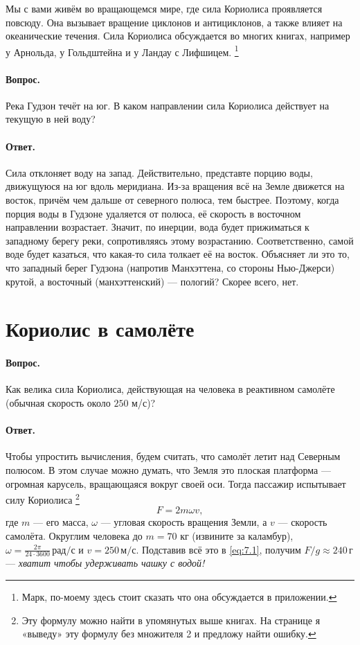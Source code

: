 Мы с вами живём во вращающемся мире, где сила Кориолиса проявляется повсюду.
Она вызывает вращение циклонов и антициклонов, а также влияет на океанические течения.
Сила Кориолиса обсуждается во многих книгах, например у \label{Арнольд-Лифшиц} Арнольда, у Гольдштейна и у Ландау с Лифшицем.%
\footnote{Марк, по-моему здесь стоит сказать что она обсуждается в приложении.}

\paragraph{Вопрос.}\label{Гудзон}
Река Гудзон течёт на юг.
В каком направлении сила Кориолиса действует на текущую в ней воду?

\paragraph{Ответ.}
Сила отклоняет воду на запад.
Действительно, представте порцию воды, движущуюся на юг вдоль меридиана.
Из-за вращения всё на Земле движется на восток, причём чем дальше от северного полюса, тем быстрее.
Поэтому, когда порция воды в Гудзоне удаляется от полюса, её скорость в восточном направлении возрастает.
Значит, по инерции, вода будет прижиматься к западному берегу реки,
сопротивляясь этому возрастанию.
Соответственно, самой воде будет казаться, что какая-то сила толкает её на восток.
Объясняет ли это то, что западный берег Гудзона (напротив Манхэттена, со стороны Нью-Джерси) крутой, а восточный (манхэттенский) --- пологий?
Скорее всего, нет.

\section{Кориолис в самолёте}\label{Кориолис в самолёте}

\paragraph{Вопрос.}
Как велика сила Кориолиса, действующая на человека в реактивном самолёте (обычная скорость около $250$ м/с)?

\paragraph{Ответ.}
Чтобы упростить вычисления, будем считать, что самолёт летит над Северным полюсом.
В этом случае можно думать, что Земля это плоская платформа --- огромная карусель, вращающаяся вокруг своей оси.
Тогда пассажир испытывает силу Кориолиса%
\footnote{Эту формулу можно найти в упомянутых выше книгах. На странице \pageref{Парадокс с Кориолисом} я «выведу» эту формулу без множителя 2 и предложу найти ошибку.}
\begin{equation}
F = 2 m \omega v,
\label{eq:7.1}
\end{equation}
где $m$ --- его масса,
$\omega$ --- угловая скорость вращения Земли,
а $v$ — скорость самолёта.
Округлим человека до $m = 70$ кг (извините за каламбур),
$\omega = \tfrac{2\pi}{24 \cdot 3600}\,\text{рад/с}$ и
$v = 250 \,\text{м/с}$.
Подставив всё это в \eqref{eq:7.1}, получим
$F/g \approx 240 \,\text{г}$ --- \emph{хватит чтобы удерживать чашку с водой!}

